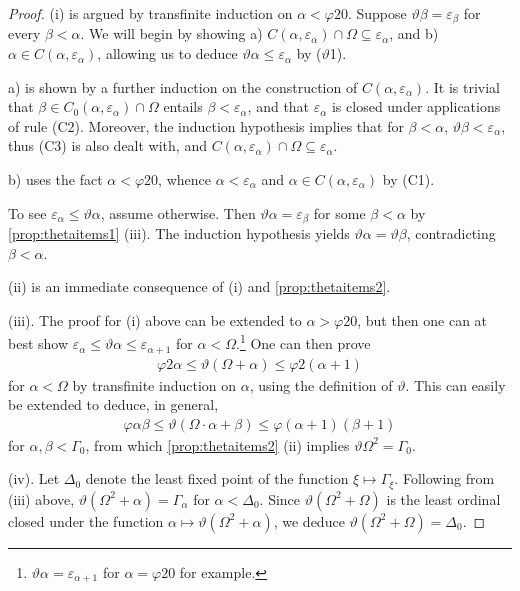 \documentclass[UKenglish,cleveref,DIV=12]{scrartcl}
\theoremstyle{definition}
\theoremstyle{definition}
\begin{document}
\begin{proof}
 (i) is argued by transfinite induction on $\alpha<\varphi20$. Suppose
$\vartheta\beta=\varepsilon_\beta$ for every $\beta<\alpha$. We will begin by
showing a) $C(\alpha,\varepsilon_\alpha)\cap\Omega\subseteq\varepsilon_\alpha$,
and b) $\alpha\in C(\alpha,\varepsilon_\alpha)$, allowing us to deduce
$\vartheta\alpha\le\varepsilon_\alpha$ by ($\vartheta$1).

a) is shown by a further induction on the construction of $C(\alpha,\varepsilon_\alpha)$. It is trivial that $\beta\in C_0(\alpha,\varepsilon_\alpha)\cap\Omega$ entails $\beta<\varepsilon_\alpha$, and that $\varepsilon_\alpha$ is closed under applications of rule (C2). Moreover, the induction hypothesis implies that for $\beta<\alpha$, $\vartheta\beta<\varepsilon_\alpha$, thus (C3) is also dealt with, and $C(\alpha,\varepsilon_\alpha)\cap\Omega\subseteq\varepsilon_\alpha$.

b) uses the fact $\alpha<\varphi20$, whence $\alpha<\varepsilon_\alpha$ and $\alpha\in C(\alpha,\varepsilon_\alpha)$ by (C1).

To see $\varepsilon_\alpha\le\vartheta\alpha$, assume otherwise. Then $\vartheta\alpha=\varepsilon_\beta$ for some $\beta<\alpha$ by \cref{prop:thetaitems1} (iii). The induction hypothesis yields $\vartheta\alpha=\vartheta\beta$, contradicting $\beta<\alpha$.

(ii) is an immediate consequence of (i) and \cref{prop:thetaitems2}.

(iii). The proof for (i) above can be extended to $\alpha>\varphi20$, but then one can at best show $\varepsilon_\alpha\le\vartheta\alpha\le\varepsilon_{\alpha+1}$ for $\alpha<\Omega$.\footnote{$\vartheta\alpha=\varepsilon_{\alpha+1}$ for $\alpha=\varphi20$ for example.} One can then prove
\begin{align*}
  \varphi2\alpha\le\vartheta(\Omega+\alpha)\le\varphi2(\alpha+1)
\end{align*}
for $\alpha<\Omega$ by transfinite induction on $\alpha$, using the definition of
$\vartheta$. This can easily be extended to deduce, in general,
\begin{align*}
 \varphi\alpha\beta\le\vartheta(\Omega\cdot\alpha+\beta)\le\varphi(\alpha+1)(\beta+1)
\end{align*}
for $\alpha,\beta<\Gamma_0$, from which \cref{prop:thetaitems2} (ii) implies
$\vartheta\Omega^2=\Gamma_0$.

(iv). Let $\Delta_0$ denote the least fixed point of the function
$\xi\mapsto\Gamma_\xi$. Following from (iii) above,
$\vartheta(\Omega^2+\alpha)=\Gamma_\alpha$ for $\alpha<\Delta_0$. Since
$\vartheta(\Omega^2+\Omega)$ is the least ordinal closed under the function
$\alpha\mapsto\vartheta(\Omega^2+\alpha)$, we deduce $\vartheta(\Omega^2+\Omega)
=\Delta_0$.
\end{proof}
\end{document}
